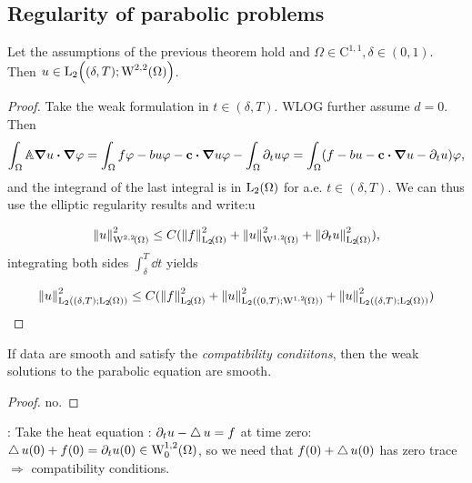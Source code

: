 \documentclass{article}
\begin{document}
\subsection{Regularity of parabolic problems}
\label{sec:parabolic_regularity}
\begin{theorem}
	Let the assumptions of the previous theorem hold and $\Omega \in \text{C}^{1,1}, \delta \in (0,1).$ Then $ u \in \LpIntX{2}{\delta}{T}{\WkpSet[2][2]{\Omega}}$.
\end{theorem}

\begin{proof}
	Take the weak formulation in $t \in (\delta,T)$. WLOG further assume $d=0$. Then
	\begin{equation*}
		\int_{\Omega} \tensorq{A} \grad{u} \vdot \grad{\varphi}  = \int_{\Omega}f \varphi - bu \varphi - \vb{c}\vdot \grad{u} \varphi - \int_{\Omega} \partial_t u \varphi = \int_{\Omega}(f-bu-\vb{c}\vdot \grad{u} - \partial_t u) \varphi,
	\end{equation*}
	and the integrand of the last integral is in $\LpSet[2]{\Omega}$ for a.e. $t \in (\delta,T)$. We can thus use the elliptic regularity results and write:u

	\begin{equation*}
		\norm{u}_{\WkpSet[2][2]{\Omega}}^{2} \leq C(\norm{f}_{\LpSet[2]{\Omega}}^{2} + \norm{u}_{\WkpSet[1][2]{\Omega}}^{2} + \norm{\partial_t u}_{\LpSet[2]{\Omega}}^{2}),
	\end{equation*}
	integrating both sides $\int_{\delta}^T \dd{t}$ yields

	\begin{equation*}
		\NormLpIntX{u}{2}{\delta}{T}{\LpSet[2]{\Omega}}^{2} \leq C(\norm{f}_{\LpSet[2]{\Omega}}^{2} + \NormLpIntX{u}{2}{0}{T}{\WkpSet[1][2]{\Omega}} ^{2} + \NormLpIntX{u}{2}{\delta}{T}{\LpSet[2]{\Omega}}^{2})
	\end{equation*}
\end{proof}

\begin{theorem}
	If data are smooth and satisfy the \textit{compatibility condiitons}, then the weak solutions to the parabolic equation are smooth.
\end{theorem}
\begin{proof}
	no.
\end{proof}

\begin{remark}:
	Take the heat equation :
	$\partial_t u -  \operatorname{\bigtriangleup} u  = f$ at time zero: $\laplace u (0) + f(0) = \partial_t u(0) \in \WkpzeroSet[1][2]{\Omega}$, so we need that $f(0) + \operatorname{\bigtriangleup} u (0)$ has zero trace $\Rightarrow$ compatibility conditions. 
\end{remark}
\end{document}
